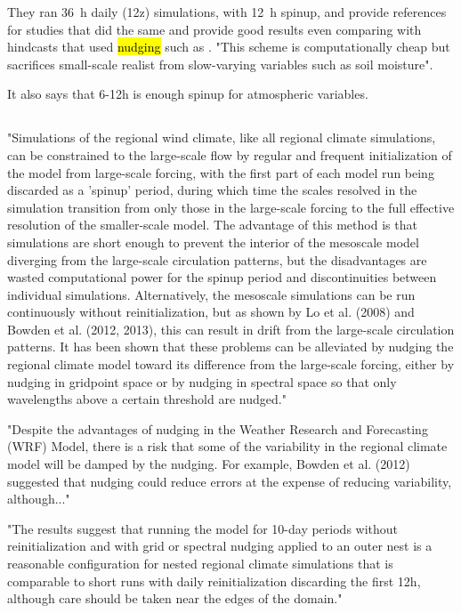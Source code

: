 \documentclass[12pt,a4paper]{article}
\begin{document}
They ran 36~h daily (12z) simulations, with 12~h spinup, and provide references for studies that did the same and provide good results even comparing with hindcasts that used \hl{nudging} such as \cite{Menendez2014}. "This scheme is computationally cheap but sacrifices small-scale realist from slow-varying variables such as soil moisture".  

It also says that 6-12h is enough spinup for atmospheric variables.

\subsection{\cite{Vincent2015}}

"Simulations of the regional wind climate, like all regional climate simulations, can be constrained to the large-scale flow by regular and frequent initialization of the model from large-scale forcing, with the first part of each model run being discarded as a 'spinup’ period, during which time the scales resolved in the simulation transition from only those in the large-scale forcing to the full effective resolution of the smaller-scale model. The advantage of this method is that simulations are short enough to prevent the interior of the mesoscale model diverging from the large-scale circulation patterns, but the disadvantages are wasted computational power for the spinup period and discontinuities between individual simulations. Alternatively, the mesoscale simulations can be run continuously without reinitialization, but as shown by Lo et al. (2008) and Bowden et al. (2012, 2013), this can result in drift from the large-scale circulation patterns. It has been shown that these problems can be alleviated by nudging the regional climate model toward its difference from the large-scale forcing, either by nudging in gridpoint space or by nudging in spectral space so that only wavelengths above a certain threshold are nudged."

"Despite the advantages of nudging in the Weather Research and Forecasting (WRF) Model, there is a risk that some of the variability in the regional climate model will be damped by the nudging. For example, Bowden et al. (2012) suggested that nudging could reduce errors at the expense of reducing variability, although..."

"The results suggest that running the model for 10-day periods without reinitialization and with grid or spectral nudging applied to an outer nest is a reasonable configuration for nested regional climate simulations that is comparable to short runs with daily reinitialization discarding the first 12h, although care should be taken near the edges of the domain."
\end{document}
